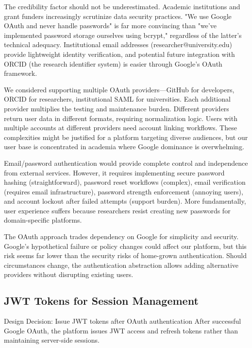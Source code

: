 \documentclass[12pt,a4paper]{article}
\begin{document}
The credibility factor should not be underestimated. Academic institutions and grant funders increasingly scrutinize data security practices. "We use Google OAuth and never handle passwords" is far more convincing than "we've implemented password storage ourselves using bcrypt," regardless of the latter's technical adequacy. Institutional email addresses (researcher@university.edu) provide lightweight identity verification, and potential future integration with ORCID (the research identifier system) is easier through Google's OAuth framework.

We considered supporting multiple OAuth providers—GitHub for developers, ORCID for researchers, institutional SAML for universities. Each additional provider multiplies the testing and maintenance burden. Different providers return user data in different formats, requiring normalization logic. Users with multiple accounts at different providers need account linking workflows. These complexities might be justified for a platform targeting diverse audiences, but our user base is concentrated in academia where Google dominance is overwhelming.

Email/password authentication would provide complete control and independence from external services. However, it requires implementing secure password hashing (straightforward), password reset workflows (complex), email verification (requires email infrastructure), password strength enforcement (annoying users), and account lockout after failed attempts (support burden). More fundamentally, user experience suffers because researchers resist creating new passwords for domain-specific platforms.

The OAuth approach trades dependency on Google for simplicity and security. Google's hypothetical failure or policy changes could affect our platform, but this risk seems far lower than the security risks of home-grown authentication. Should circumstances change, the authentication abstraction allows adding alternative providers without disrupting existing users.

\subsection{JWT Tokens for Session Management}

\begin{rationale}{Design Decision: Issue JWT tokens after OAuth authentication}
After successful Google OAuth, the platform issues JWT access and refresh tokens rather than maintaining server-side sessions.
\end{rationale}
\end{document}
